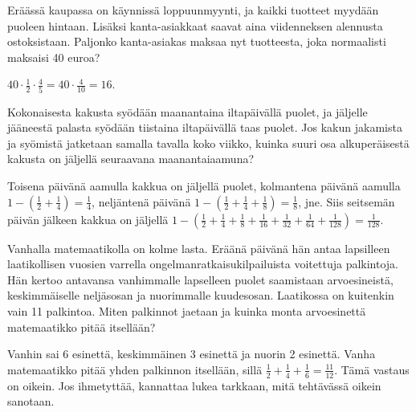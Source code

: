 \begin{tehtavasivu}
    
\begin{tehtava}
	Eräässä kaupassa on käynnissä loppuunmyynti, ja kaikki tuotteet
    myydään puoleen hintaan. Lisäksi kanta-asiakkaat saavat aina
    viidenneksen alennusta ostoksistaan.
	Paljonko kanta-asiakas maksaa nyt tuotteesta, joka normaalisti
    maksaisi 40 euroa?
    \begin{vastaus}
		$40\cdot \frac{1}{2} \cdot \frac{4}{5}=40\cdot \frac{4}{10}= 16$. 
	\end{vastaus}
\end{tehtava}
    
\begin{tehtava}
	Kokonaisesta kakusta syödään maanantaina iltapäivällä puolet, ja jäljelle
	jääneestä palasta syödään tiistaina iltapäivällä taas puolet.
	Jos kakun jakamista ja syömistä jatketaan samalla tavalla koko viikko,
	kuinka suuri osa alkuperäisestä kakusta on
	jäljellä seuraavana maanantaiaamuna?
	\begin{vastaus}
		Toisena päivänä aamulla kakkua on jäljellä puolet, kolmantena
		päivänä aamulla
		$1-\left(\frac{1}{2} + \frac{1}{4}\right) = \frac{1}{4}$, 
		neljäntenä päivänä
		$1-\left(\frac{1}{2} + \frac{1}{4} + \frac{1}{8}\right)
		= \frac{1}{8}$, jne.
		Siis seitsemän päivän jälkeen kakkua on jäljellä
		$1-\left(\frac{1}{2} + \frac{1}{4} + \frac{1}{8} +
		\frac{1}{16} + \frac{1}{32} + \frac{1}{64} + \frac{1}{128}\right)
		= \frac{1}{128}$.  
	\end{vastaus}
\end{tehtava}


\begin{tehtava}
	Vanhalla matemaatikolla on kolme lasta. Eräänä päivänä hän antaa lapsilleen laatikollisen vuosien varrella 						
	ongelmanratkaisukilpailuista voitettuja palkintoja. Hän kertoo antavansa vanhimmalle lapselleen puolet
	saamistaan arvoesineistä, keskimmäiselle neljäsosan ja nuorimmalle kuudesosan. Laatikossa on kuitenkin vain 11 palkintoa. Miten 	
	palkinnot jaetaan ja kuinka monta arvoesinettä matemaatikko pitää itsellään?
	\begin{vastaus}
		Vanhin sai 6 esinettä, keskimmäinen 3 esinettä ja nuorin 2 esinettä. Vanha
		matemaatikko pitää yhden palkinnon itsellään, sillä $\frac{1}{2} + \frac{1}{4}
		+ \frac{1}{6} = \frac{11}{12}$. Tämä vastaus on oikein. Jos ihmetyttää, kannattaa lukea tarkkaan, mitä tehtävässä oikein sanotaan.
	\end{vastaus}
\end{tehtava}


\end{tehtavasivu}

